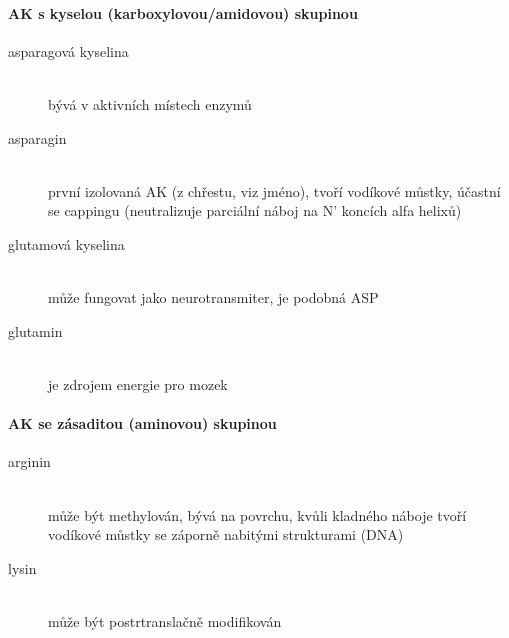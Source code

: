 \documentclass[DIV=8]{scrreprt}
\newcommand{\mybox}[2]{
    \paragraph{#1} #2
}
\begin{document}
\mybox{AK s kyselou (karboxylovou/amidovou) skupinou}{\begin{description}
\item[asparagová kyselina]\hfill \\
bývá v aktivních místech enzymů


\item[asparagin]\hfill \\
první izolovaná AK (z chřestu, viz jméno), tvoří vodíkové můstky, účastní se cappingu (neutralizuje parciální náboj na N' koncích alfa helixů)


\item[glutamová kyselina]\hfill \\
může fungovat jako neurotransmiter, je podobná ASP


\item[glutamin]\hfill \\
je zdrojem energie pro mozek

\end{description}
}


\mybox{AK se zásaditou (aminovou) skupinou}{\begin{description}
\item[arginin]\hfill \\
může být methylován, bývá na povrchu, kvůli kladného náboje tvoří vodíkové můstky se záporně nabitými strukturami (DNA)


\item[lysin]\hfill \\
může být postrtranslačně modifikován

\end{description}
}
\end{document}
